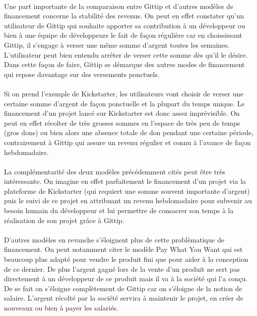 \paragraph{}
Une part importante de la comparaison entre Gittip et d'autres modèles de
financement concerne la stabilité des revenus. On peut en effet constater qu'un
utilisateur de Gittip qui souhaite apporter sa contribution à un développeur ou
bien à une équipe de développeurs le fait de façon régulière car en
choississant
Gittip, il s'engage à verser une même somme d'argent toutes les semaines.
L'utilisateur peut bien entendu arrêter de verser cette somme dès qu'il le
désire. Dans cette façon de faire, Gittip se démarque des autres modes de
financement qui repose davantage sur des versements ponctuels.

\paragraph{}
Si on prend l'exemple de Kickstarter, les utilisateurs vont choisir de verser
une certaine somme d'argent de façon ponctuelle et la plupart du temps unique.
Le financement d'un projet lancé sur Kickstarter est donc assez imprévisible.
On peut en effet récolter de très grosses sommes en l'espace de très peu de
temps
(gros dons) ou bien alors une absence totale de don pendant une certaine
période, contrairement à Gittip qui assure un revenu régulier et connu à
l'avance de façon hebdomadaire.

\paragraph{}
La complémentarité des deux modèles précédemment cités peut être très
intéressante. On
imagine en effet parfaitement le financement d'un projet via la plateforme de
Kickstarter (qui requiert une somme souvent importante d'argent) puis le suivi
de ce projet en attribuant un revenu hebdomadaire pour subvenir au besoin
humain du développeur et lui permettre de consacrer son temps à la réalisation
de son projet grâce à Gittip.

\paragraph{}
D'autres modèles en revanche s'éloignent plus de cette problèmatique de
financement. On peut notamment citer le modèle Pay What You Want qui est
beaucoup plus adapté pour vendre le produit fini que pour aider à la conception
de ce dernier. De plus l'argent gagné lors de la vente d'un produit ne sert pas
directement à un développeur de ce produit mais il va à la société qui l'a
conçu. De se fait on s'éloigne complètement de Gittip car on s'éloigne de la
notion de salaire. L'argent récolté par la société servira à maintenir le
projet, en créer de nouveaux ou bien à payer les salariés.

